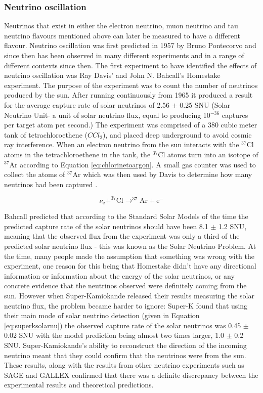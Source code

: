 \documentclass[11pt,oneside,a4paper]{article}
\begin{document}
\subsubsection{Neutrino oscillation}
Neutrinos that exist in either the electron neutrino, muon neutrino and tau neutrino flavours mentioned above can later be measured to have a different flavour. Neutrino oscillation was first predicted in 1957 by Bruno Pontecorvo and since then has been observed in many different experiments and in a range of different contexts since then.\cite{pontecorvo}
\newline
The first experiment to have identified the effects of neutrino oscillation was Ray Davis' and John N. Bahcall's Homestake experiment. The purpose of the experiment was to count the number of neutrinos produced by the sun. After running continuously from 1965 it produced a result for the average capture rate of solar neutrinos of 2.56 $\pm$ 0.25 SNU (Solar Neutrino Unit- a unit of solar neutrino flux, equal to producing 10$^{-36}$ captures per target atom per second.) The experiment was comprised of a 380 cubic meter tank of tetrachloroethene ($CCl_{2}$), and placed deep underground to avoid cosmic ray interference. When an electron neutrino from the sun interacts with the $^{37} \mathrm{Cl}$ atoms in the tetrachloroethene in the tank, the $^{37} \mathrm{Cl}$ atoms turn into an isotope of $^{37} \mathrm{Ar}$ according to Equation \ref{eq:chlorinetoargon}. A small gas counter was used to collect the atoms of $^{37} \mathrm{Ar}$ which was then used by Davis to determine how many neutrinos had been captured \cite{homestake}.  

\begin{equation}
\label{eq:chlorinetoargon}
\nu_{\mathrm{e}}+^{37} \mathrm{Cl} \longrightarrow^{37} \mathrm{Ar}+\mathrm{e}^{-}
\end{equation}

Bahcall predicted that according to the Standard Solar Models of the time the predicted capture rate of the solar neutrinos should have been 8.1 $\pm$ 1.2 SNU, meaning that the observed flux from the experiment was only a third of the predicted solar neutrino flux - this was known as the Solar Neutrino Problem. At the time, many people made the assumption that something was wrong with the experiment, one reason for this being that Homestake didn't have any directional information or information about the energy of the solar neutrinos, or any concrete evidence that the neutrinos observed were definitely coming from the sun. However when Super-Kamiokande released their results measuring the solar neutrino flux, the problem became harder to ignore: Super-K found that using their main mode of solar neutrino detection (given in Equation \ref{eq:superksolarnu}) the observed capture rate of the solar neutrinos was 0.45 $\pm$ 0.02 SNU with the model prediction being almost two times larger, 1.0 $\pm$ 0.2 SNU. Super-Kamiokande's ability to reconstruct the direction of the incoming neutrino meant that they could confirm that the neutrinos were from the sun. These results, along with the results from other neutrino experiments such as SAGE and GALLEX confirmed that there was a definite discrepancy between the experimental results and theoretical predictions.
\end{document}
